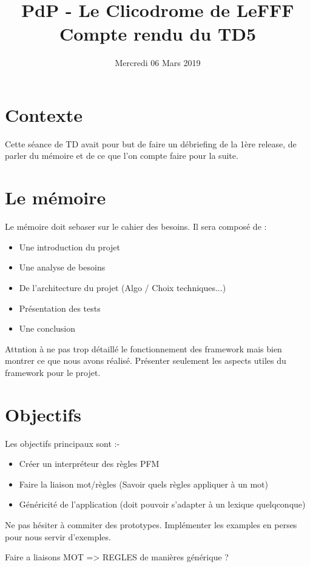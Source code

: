 \documentclass{article}
\title{PdP - Le Clicodrome de LeFFF \\ Compte rendu du TD5}
\author{}
\date{Mercredi 06 Mars 2019}
\begin{document}
\maketitle

\section{Contexte}
Cette séance de TD avait pour but de 
faire un débriefing de la 1ère release, de parler du mémoire et de ce que l'on compte faire pour la suite.

\section{Le mémoire}
Le mémoire doit sebaser sur le cahier des besoins. Il sera composé de :
\begin{itemize}
    \item Une introduction du projet
    \item Une analyse de besoins
    \item De l'architecture du projet (Algo / Choix techniques...)
    \item Présentation des tests
    \item Une conclusion
\end{itemize}
Attntion à ne pas trop détaillé le fonctionnement des framework mais bien montrer ce que nous avons réalisé.
Présenter seulement les aspects utiles du framework pour le projet.

\section{Objectifs}
Les objectifs principaux sont :- 
\begin{itemize}
    \item Créer un interpréteur des règles PFM
    \item Faire la liaison mot/règles (Savoir quels règles appliquer à un mot)
    \item Généricité de l'application (doit pouvoir s'adapter à un lexique quelqconque)
\end{itemize}

Ne pas hésiter à commiter des prototypes.
Implémenter les examples en perses pour nous servir d'exemples.

Faire a liaisons MOT => REGLES de manières générique ?
\end{document}
